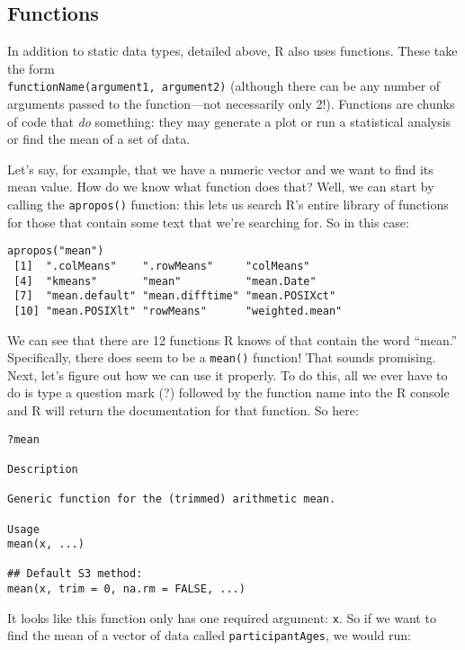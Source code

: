 \subsection{Functions}
In addition to static data types, detailed above, R also uses functions. These take the form \\\verb|functionName(argument1, argument2)| (although there can be any number of arguments passed to the function---not necessarily only 2!). Functions are chunks of code that \textit{do} something: they may generate a plot or run a statistical analysis or find the mean of a set of data.

Let's say, for example, that we have a numeric vector and we want to find its mean value. How do we know what function does that? Well, we can start by calling the \verb|apropos()| function: this lets us search R's entire library of functions for those that contain some text that we're searching for. So in this case:

\begin{framed}
\begin{Verbatim}[samepage=TRUE]
apropos("mean")
 [1]  ".colMeans"    ".rowMeans"     "colMeans"
 [4]  "kmeans"       "mean"          "mean.Date"
 [7]  "mean.default" "mean.difftime" "mean.POSIXct"
 [10] "mean.POSIXlt" "rowMeans"      "weighted.mean"
\end{Verbatim}
\end{framed}

We can see that there are 12 functions R knows of that contain the word ``mean.'' Specifically, there does seem to be a \verb|mean()| function! That sounds promising. Next, let's figure out how we can use it properly. To do this, all we ever have to do is type a question mark (?) followed by the function name into the R console and R will return the documentation for that function. So here:

\begin{framed}
\begin{Verbatim}[samepage=TRUE]
?mean

Description

Generic function for the (trimmed) arithmetic mean.

Usage
mean(x, ...)

## Default S3 method:
mean(x, trim = 0, na.rm = FALSE, ...)
\end{Verbatim}
\end{framed}

It looks like this function only has one required argument: \verb|x|. So if we want to find the mean of a vector of data called \verb|participantAges|, we would run:

